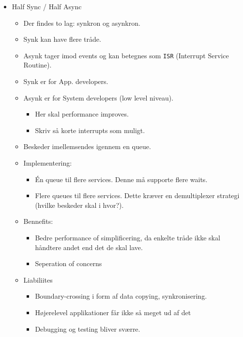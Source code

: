\documentclass[oneside, 10pt]{memoir}
\begin{document}
\begin{itemize}
	\item Half Sync / Half Async
	
	\begin{itemize}
		\item Der findes to lag: synkron og asynkron.
		
		\item Synk kan have flere tråde.
		
		\item Asynk tager imod events og kan betegnes som \texttt{ISR} (Interrupt Service Routine).
		
		\item Synk er for App. developers.

		\item Asynk er for System developers (low level niveau).
		\begin{itemize}
			\item Her skal performance improves.
			\item Skriv så korte interrupts som muligt.
		\end{itemize}
		
		\item Beskeder imellemsendes igennem en queue.
		
		\item Implementering:
		\begin{itemize}
			\item Én queue til flere services. Denne må supporte flere waits.
			\item Flere queues til flere services. Dette kræver en demultiplexer strategi (hvilke beskeder skal i hvor?).
		\end{itemize}

		\item Bennefits:
		\begin{itemize}
			\item Bedre performance of simplificering, da enkelte tråde ikke skal håndtere andet end det de skal lave.
			\item Seperation of concerns
		\end{itemize}

		\item Liabiliites
		\begin{itemize}
			\item Boundary-crossing i form af data copying, synkronisering.
			\item Højerelevel applikationer får ikke så meget ud af det
			\item Debugging og testing bliver sværre. 
		\end{itemize}
	\end{itemize}



\end{itemize}
\end{document}
